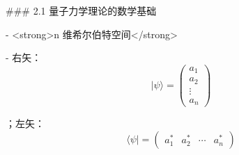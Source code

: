
### 2.1 量子力学理论的数学基础

- <strong>n 维希尔伯特空间</strong>

  - 右矢：
    $$
    |\psi\rangle=\left(\begin{array}{c}
    a_{1} \\
    a_{2} \\
    \vdots \\
    a_{n}
    \end{array}\right)
    $$

    ；左矢：
    $$
    \langle\psi|=\left(\begin{array}{c}
    a_{1}^{*} &
    a_{2}^{*} &
    \cdots &
    a_{n}^{*}
    \end{array}\right)
    $$